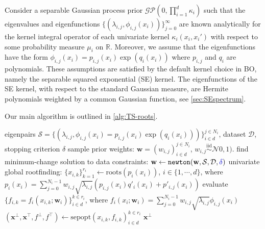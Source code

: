 \documentclass{article}
\newcommand{\edit}[1]{\textcolor{blue!80!black}{#1}} %
\begin{document}
Consider a separable Gaussian process prior
$\mathcal{GP}(0, \prod_{i=1}^d \kappa_i)$ such that the eigenvalues
and eigenfunctions $\{(\lambda_{i,j}, \phi_{i,j}(x_i))\}_{j=0}^\infty$
are known analytically for the kernel integral operator of each
univariate kernel $\kappa_i(x_i, x_i')$ with respect to some
probability measure $\mu_i$ on $\mathbb{R}$.
Moreover, we assume
that the eigenfunctions have the form
$\phi_{i,j}(x_i) = p_{i,j}(x_i) \exp(q_i(x_i))$ where $p_{i,j}$ and
$q_i$ are polynomials.
These assumptions are satisfied by the default
kernel choice in BO, namely the separable squared exponential (SE) kernel.%
The eigenfunctions of the SE kernel, with respect to the standard Gaussian
measure, are Hermite polynomials weighted by a common Gaussian function,
see \cref{sec:SEspectrum}.

Our main algorithm is outlined in \cref{alg:TS-roots}.

\begin{algorithm}[h]
  \caption{\texttt{TS-roots}: Global optimization of a separable %
    Thompson sample via rootfinding.}
  \label{alg:TS-roots}
  \begin{algorithmic}[1] %
    \Input eigenpairs
    $\mathcal{S} = \{(\lambda_{i,j}, \phi_{i,j}(x_i) = p_{i,j}(x_i) \exp(q_i(x_i)))\}_{i \in d}^{j \in N_i}$,
    dataset $\mathcal{D}$,
    \edit{stopping criterion $\delta$}
    \State sample prior weights: $\mathbf{w} = (w_{i,j})_{i \in d}^{j \in N_i}$,
    $w_{i,j} \overset{\text{iid}}{\sim} \mathcal{N}0, 1)$.
    \State find minimum-change solution to data constraints:
    $\mathbf{w} \gets \texttt{newton}(\mathbf{w}, \mathcal{S}, \mathcal{D}, \edit{\delta})$
    \State univariate global rootfinding: $\{x_{i,k}\}_{k=1}^{r_i} \gets \mathrm{roots}(p_i(x_i))$,
    $i \in \{1, \cdots, d\}$, where \newline
    $p_i(x_i) = \sum_{j=0}^{N_i - 1} w_{i,j} \sqrt{\lambda_{i,j}} (p_{i,j}(x_i) q'_i(x_i) + p'_{i,j}(x_i))$
    \State evaluate $\{f_{i,k} = f_i(x_{i,k}; \mathbf{w}_i)\}_{i \in d}^{k \in r_i}$, where
    $f_i(x_i; \mathbf{w}_i) = \sum_{j=0}^{N_i - 1} w_{i,j} \sqrt{\lambda_{i,j}} \phi_{i,j}(x_i)$
    \State $(\mathbf{x}^\bot, \mathbf{x}^\top, f^\bot, f^\top) \gets
    \mathrm{sepopt}(x_{i,k}, f_{i,k})_{i \in d}^{k \in r_i}$
    \Output $\mathbf{x}^\bot$
  \end{algorithmic}
\end{algorithm}
\end{document}
